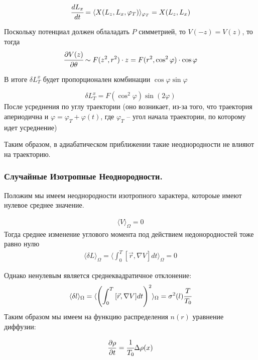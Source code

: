 \documentclass[a4paper, 14pt]{article}
\begin{document}
\begin{equation*}
\cfrac{d L_x}{dt} = \langle X(L_z,L_x,\varphi_T)\rangle _{\varphi_T} = X(L_z,L_x)
\end{equation*}

Поскольку потенциал должен облаладать $P$ симметрией, то $V(-z) = V(z)$, то тогда 
\begin{equation*}
\cfrac{\partial V(z)}{\partial \theta} 
\sim F(z^2,r^2)\cdot z =
F(r^2,\cos^2{\varphi}) \cdot \cos{\varphi}
\end{equation*}

В итоге $\delta L^{x}_{T}$ будет пропорционален комбинации $\cos{\varphi} \sin{\varphi}$

\begin{equation*}
\delta L^{x}_{T} = F(\cos^2{\varphi}) \sin(2\varphi)
\end{equation*}
После усреднения по углу траектории (оно возникает, из-за того, что траектория апериодична и $\varphi = \varphi_T + \varphi(t)$, где $\varphi_T$ – угол начала траектории, по которому идет усреднение)

Таким образом, в адиабатическом приближении такие неоднородности не влияют на траекторию.

\subsubsection{Случайные Изотропные Неоднородности.}

Положим мы имеем неоднородности изотропного характера, котороые имеют нулевое среднее значение.

\begin{eqnarray}
	\langle V \rangle_{\Omega} = 0
\end{eqnarray}
Тогда среднее изменение углового момента под действием недонородностей тоже равно нулю
\begin{eqnarray}
	\langle \delta L \rangle_{\Omega} = \langle \int_0^T{[\vec{r},\nabla V] dt} \rangle_{\Omega} = 0
\end{eqnarray}

Однако ненулевым является среднеквадратичное отклонение:
\begin{eqnarray}
	\langle \delta l \rangle_{\Omega} = \langle \left(\int_0^T{[\vec{r},\nabla V] dt} \right)^2\rangle_{\Omega} = \sigma^2(l) \cfrac{T}{T_0}
\end{eqnarray}
Таким образом мы имеем на функцию распределения $n(r)$ уравнение диффузии:

\begin{equation*}
	\frac{\partial \rho}{\partial t} =  \cfrac{1}{T_0} \Delta \rho(x)
\end{equation*} 
\end{document}
